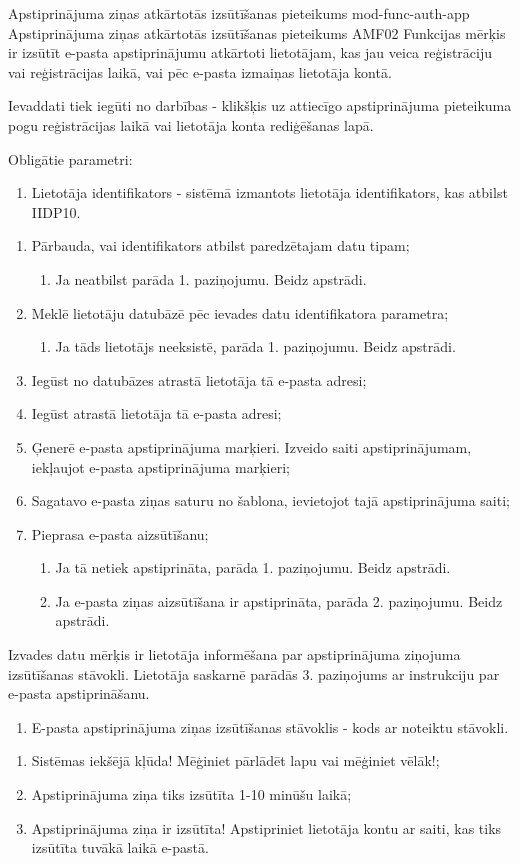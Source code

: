 \moduleFunctionTable
{Apstiprinājuma ziņas atkārtotās izsūtīšanas pieteikums}
{mod-func-auth-app}
{Apstiprinājuma ziņas atkārtotās izsūtīšanas pieteikums}
{AMF02}
{
	Funkcijas mērķis ir izsūtīt e-pasta apstiprinājumu atkārtoti lietotājam, kas jau veica reģistrāciju vai reģistrācijas laikā, vai pēc e-pasta izmaiņas lietotāja kontā.
}
{
	Ievaddati tiek iegūti no darbības - klikšķis uz attiecīgo apstiprinājuma pieteikuma pogu reģistrācijas laikā vai lietotāja konta rediģēšanas lapā.

	Obligātie parametri:
	\begin{enumerate}
		\item Lietotāja identifikators - sistēmā izmantots lietotāja identifikators, kas atbilst IIDP10.
	\end{enumerate}
}
{
	\begin{enumerate}
		\item Pārbauda, vai identifikators atbilst paredzētajam datu tipam;
		      \begin{enumerate}
			      \item Ja neatbilst parāda 1. paziņojumu. Beidz apstrādi.
		      \end{enumerate}
		\item Meklē lietotāju datubāzē pēc ievades datu identifikatora parametra;
		      \begin{enumerate}
			      \item Ja tāds lietotājs neeksistē, parāda 1. paziņojumu. Beidz apstrādi.
		      \end{enumerate}
		\item Iegūst no datubāzes atrastā lietotāja tā e-pasta adresi;
		\item Iegūst atrastā lietotāja tā e-pasta adresi;
		\item Ģenerē e-pasta apstiprinājuma marķieri. Izveido saiti apstiprinājumam, iekļaujot e-pasta apstiprinājuma marķieri;
		\item Sagatavo e-pasta ziņas saturu no šablona, ievietojot tajā apstiprinājuma saiti;
		\item Pieprasa e-pasta aizsūtīšanu;
		      \begin{enumerate}
			      \item Ja tā netiek apstiprināta, parāda 1. paziņojumu. Beidz apstrādi.
			      \item Ja e-pasta ziņas aizsūtīšana ir apstiprināta, parāda 2. paziņojumu. Beidz apstrādi.
		      \end{enumerate}
	\end{enumerate}
}
{
	Izvades datu mērķis ir lietotāja informēšana par apstiprinājuma ziņojuma izsūtīšanas stāvokli.
	Lietotāja saskarnē parādās 3. paziņojums ar instrukciju par e-pasta apstiprināšanu.
	\begin{enumerate}
		\item E-pasta apstiprinājuma ziņas izsūtīšanas stāvoklis - kods ar noteiktu stāvokli.
	\end{enumerate}
}
{
	\begin{enumerate}
		\item Sistēmas iekšējā kļūda! Mēģiniet pārlādēt lapu vai mēģiniet vēlāk!;
		\item Apstiprinājuma ziņa tiks izsūtīta 1-10 minūšu laikā;
		\item Apstiprinājuma ziņa ir izsūtīta! Apstipriniet lietotāja kontu ar saiti, kas tiks izsūtīta tuvākā laikā e-pastā.
	\end{enumerate}
}
